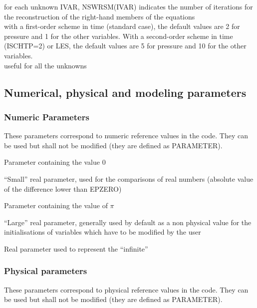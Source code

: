 {for each unknown IVAR, NSWRSM(IVAR) indicates the number of iterations for the
reconstruction of the right-hand members of the equations\\
with a first-order scheme in time
(standard case), the default values are 2 for pressure and 1 for the
other variables. With a second-order scheme in time (ISCHTP=2) or LES, the
default values are 5 for pressure and 10 for the other variables.\\
useful for all the unknowns}


\subsection{Numerical, physical and modeling parameters}
\subsubsection{Numeric Parameters}

These parameters correspond to numeric reference values in the code.
They can be used but shall not be modified (they are defined as PARAMETER).

{Parameter containing the value 0}

{``Small'' real parameter, used for the comparisons of real numbers (absolute
value of the difference lower than EPZERO)}

{Parameter containing the value of $\pi$}

{``Large'' real parameter, generally used by default as a non physical value for
the initialisations of variables which have to be modified by the user}

{Real parameter used to represent the ``infinite''}

\subsubsection{Physical parameters}
These parameters correspond to physical reference values in the code.
They can be used but shall not be modified (they are defined as PARAMETER).

